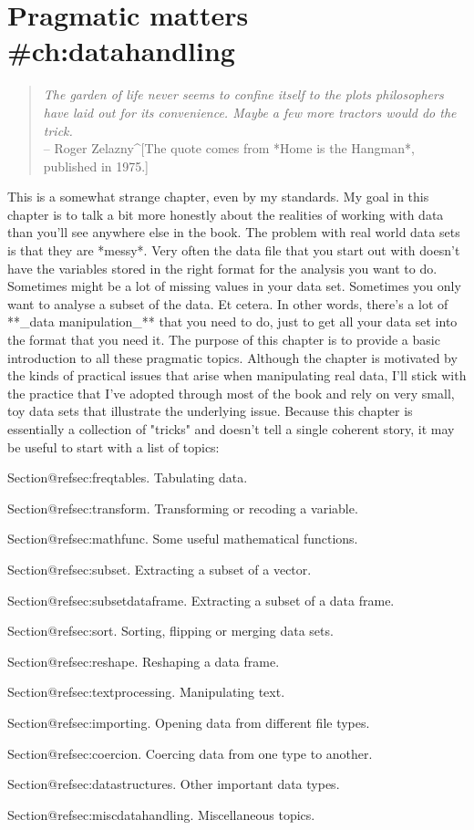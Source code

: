 

\chapter{Pragmatic matters {#ch:datahandling}}

\begin{quote}
{\it The garden of life never seems to confine itself to the plots philosophers have
laid out for its convenience. Maybe a few more tractors would do the trick.} \\ \hspace*{2cm} -- Roger Zelazny^[The quote comes from *Home is the Hangman*, published in 1975.]
\end{quote}



This is a somewhat strange chapter, even by my standards. My goal in this chapter is to talk a bit more honestly about the realities of working with data than you'll see anywhere else in the book. The problem with real world data sets is that they are *messy*. Very often the data file that you start out with doesn't have the variables stored in the right format for the analysis you want to do. Sometimes might be a lot of missing values in your data set. Sometimes you only want to analyse a subset of the data. Et cetera. In other words, there's a lot of **_data manipulation_** that you need to do, just to get all your data set into the format that you need it. The purpose of this chapter is to provide a basic introduction to all these pragmatic topics. Although the chapter is motivated by the kinds of practical issues that arise when manipulating real data, I'll stick with the practice that I've adopted through most of the book and rely on very small, toy data sets that illustrate the underlying issue. Because this chapter is essentially a collection of "tricks" and doesn't tell a single coherent story, it may be useful to start with a list of topics:
 \itemsep 0pt
\item Section@refsec:freqtables. Tabulating data.
\item Section@refsec:transform. Transforming or recoding a variable.
\item Section@refsec:mathfunc. Some useful mathematical functions.
\item Section@refsec:subset. Extracting a subset of a vector.
\item Section@refsec:subsetdataframe. Extracting a subset of a data frame.
\item Section@refsec:sort. Sorting, flipping or merging data sets.
\item Section@refsec:reshape. Reshaping a data frame.
\item Section@refsec:textprocessing. Manipulating text.
\item Section@refsec:importing. Opening data from different file types.
\item Section@refsec:coercion. Coercing data from one type to another.
\item Section@refsec:datastructures. Other important data types.
\item Section@refsec:miscdatahandling. Miscellaneous topics.

